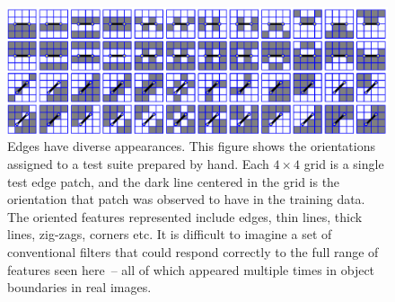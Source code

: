 \begin{figure}[bt]
\includegraphics[width=\columnwidth]{seen-selected}
\caption
{
\label{fig:seen-selected}
%
Edges have diverse appearances.  This figure shows 
the orientations assigned to a test suite
prepared by hand.  Each $4\times 4$ grid is a single test
edge patch, and the dark line centered in the grid is the orientation
that patch was observed to have in the training data.
The oriented features represented
include edges, thin lines, thick lines, zig-zags, corners
etc.  It is difficult to imagine a set of conventional
filters that could respond correctly to the full range of 
features seen here~-- all of which appeared multiple
times in object boundaries in real images.
%
}
\end{figure}

